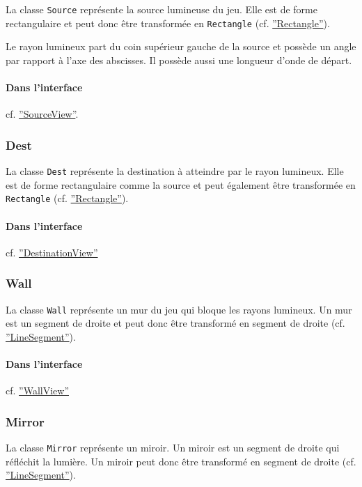\documentclass[]{article}
\begin{document}
La classe \texttt{Source} représente la source lumineuse du jeu.
Elle est de forme rectangulaire et peut donc être transformée
en \texttt{Rectangle} (cf. \hyperref[Rectangle]{''Rectangle''}).

Le rayon lumineux part du coin supérieur gauche de la source et possède
un angle par rapport à l'axe des abscisses. Il possède aussi une longueur
d'onde de départ.

\paragraph{Dans l'interface} cf. \hyperref[SourceView]{''SourceView''}.

\subsubsection{\label{Dest}Dest}

La classe \texttt{Dest} représente la destination à atteindre par 
le rayon lumineux. Elle est de forme rectangulaire comme la source
et peut également être transformée en \texttt{Rectangle} (cf. \hyperref[Rectangle]{''Rectangle''}).

\paragraph{Dans l'interface} cf. \hyperref[DestinationView]{''DestinationView''}

\subsubsection{\label{Wall}Wall}

La classe \texttt{Wall} représente un mur du jeu qui bloque les rayons
lumineux. Un mur est un segment de droite et peut donc être transformé 
en segment de droite (cf. \hyperref[LineSegment]{''LineSegment''}).

\paragraph{Dans l'interface} cf. \hyperref[WallView]{''WallView''}

\subsubsection{\label{Mirror}Mirror}

La classe \texttt{Mirror} représente un miroir. Un miroir
est un segment de droite qui réfléchit la lumière.
Un miroir peut donc être transformé en 
segment de droite (cf. \hyperref[LineSegment]{''LineSegment''}).
\end{document}
